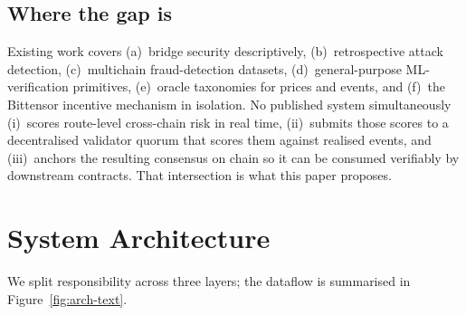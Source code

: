 \documentclass[11pt,a4paper]{article}
\begin{document}
\subsection{Where the gap is}\label{sec:related:gap}

Existing work covers (a)~bridge security descriptively, (b)~retrospective attack
detection, (c)~multichain fraud-detection datasets, (d)~general-purpose ML-verification
primitives, (e)~oracle taxonomies for prices and events, and (f)~the Bittensor incentive
mechanism in isolation. No published system simultaneously
(i)~scores route-level cross-chain risk in real time,
(ii)~submits those scores to a decentralised validator quorum that scores them against
realised events, and
(iii)~anchors the resulting consensus on chain so it can be consumed verifiably by
downstream contracts. That intersection is what this paper proposes.

\section{System Architecture}\label{sec:arch}

We split responsibility across three layers; the dataflow is summarised in
Figure~\ref{fig:arch-text}.
\end{document}
